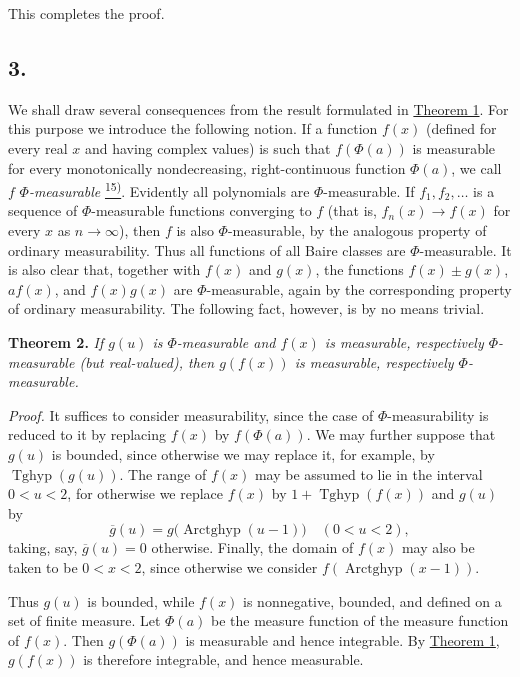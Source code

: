 \documentclass[12pt,b5paper,twoside]{article}
\newcommand{\noteref}[1]{%
  \hyperlink{note:#1}{\textsuperscript{#1)}}}
\begin{document}
This completes the proof.

\subsection*{3.}
\label{sec:I.3}
We shall draw several consequences from the result formulated in \hyperref[thm:1]{Theorem 1}. For this purpose we introduce the following notion. If a function $f(x)$ (defined for every real $x$ and having complex values) is such that $f(\Phi(a))$ is measurable for every monotonically nondecreasing, right-continuous function $\Phi(a)$, we call $f$ \emph{$\Phi$-measurable}\noteref{15}. Evidently all polynomials are $\Phi$-measurable. If $f_1,f_2,\ldots$ is a sequence of $\Phi$-measurable functions converging to $f$ (that is, $f_n(x)\to f(x)$ for every $x$ as $n\to\infty$), then $f$ is also $\Phi$-measurable, by the analogous property of ordinary measurability. Thus all functions of all Baire classes are $\Phi$-measurable. It is also clear that, together with $f(x)$ and $g(x)$, the functions $f(x)\pm g(x)$, $af(x)$, and $f(x)g(x)$ are $\Phi$-measurable, again by the corresponding property of ordinary
measurability. The following fact, however, is by no means trivial.

\label{thm:2}
\noindent\textbf{Theorem 2.} \emph{If $g(u)$ is $\Phi$-measurable and $f(x)$ is measurable, respectively $\Phi$-measurable (but real-valued), then $g(f(x))$ is measurable, respectively $\Phi$-measurable.}

\textit{Proof.} It suffices to consider measurability, since the case of $\Phi$-measurability is reduced to it by replacing $f(x)$ by $f(\Phi(a))$. We may further suppose that $g(u)$ is bounded, since otherwise we may replace it, for example, by $\operatorname{Tghyp}(g(u))$. The range of $f(x)$ may be assumed to lie in the interval $0<u<2$, for otherwise we replace $f(x)$ by $1+\operatorname{Tghyp}(f(x))$ and $g(u)$ by
\[
 \overline g(u)=g\bigl(\operatorname{Arctghyp}(u-1)\bigr)
 \quad(0<u<2),
\]
taking, say, $\overline g(u)=0$ otherwise. Finally, the domain of $f(x)$ may also be taken to be $0<x<2$, since otherwise we consider $f(\operatorname{Arctghyp}(x-1))$.

Thus $g(u)$ is bounded, while $f(x)$ is nonnegative, bounded, and defined on a set of finite measure. Let $\Phi(a)$ be the measure function of the measure function of $f(x)$. Then $g(\Phi(a))$ is measurable and hence integrable. By \hyperref[thm:1]{Theorem 1}, $g(f(x))$ is therefore integrable, and hence measurable.
\end{document}
